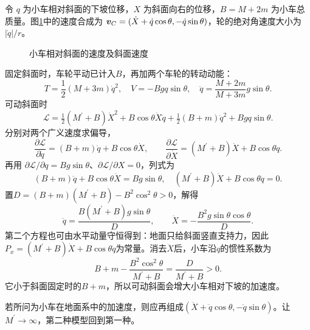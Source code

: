 \begin{solution}
令 $q$ 为小车相对斜面的下坡位移，$X$ 为斜面向右的位移，$B=M+2m$ 为小车总质量。图\ref{fig:hw1-5-s}中的速度合成为 $\bm{v}_C=(\dot X+\dot q\cos\theta,-\dot q\sin\theta)$，轮的绝对角速度大小为 $|\dot q|/r$。

\begin{figure}[H]\centering
{}
\caption{小车相对斜面的速度及斜面速度}\label{fig:hw1-5-s}
\end{figure}

固定斜面时，车轮平动已计入$B$，再加两个车轮的转动动能：
\[
 T=\frac12(M+3m)\dot q^2,\quad V=-Bgq\sin\theta,
 \quad\boxed{\ddot q=\frac{M+2m}{M+3m}g\sin\theta}.
\]
可动斜面时
\[
 \mathcal L=\tfrac12(M^\prime+B)\dot X^2+B\cos\theta\dot X\dot q
 +\tfrac12(B+m)\dot q^2+Bgq\sin\theta.
\]
分别对两个广义速度求偏导，
\[
\frac{\partial\mathcal L}{\partial\dot q}=(B+m)\dot q+B\cos\theta\dot X,
\qquad
\frac{\partial\mathcal L}{\partial\dot X}=(M^\prime+B)\dot X+B\cos\theta\dot q.
\]
再用 $\partial\mathcal L/\partial q=Bg\sin\theta$、$\partial\mathcal L/\partial X=0$，列式为
\[
 (B+m)\ddot q+B\cos\theta\ddot X=Bg\sin\theta,
 \quad(M^\prime+B)\ddot X+B\cos\theta\ddot q=0.
\]
置$D=(B+m)(M^\prime+B)-B^2\cos^2\theta>0$，解得
\[
 \boxed{\ddot q=\frac{B(M^\prime+B)g\sin\theta}{D},\qquad
 \ddot X=-\frac{B^2g\sin\theta\cos\theta}{D}}.
\]
第二个方程也可由水平动量守恒得到：地面只给斜面竖直支持力，因此$P_x=(M^\prime+B)\dot X+B\cos\theta\dot q$为常量。消去$\ddot X$后，小车沿$q$的惯性系数为
\[
 B+m-\frac{B^2\cos^2\theta}{M^\prime+B}=\frac{D}{M^\prime+B}>0.
\]
它小于斜面固定时的$B+m$，所以可动斜面会增大小车相对下坡的加速度。

若所问为小车在地面系中的加速度，则应再组成$(\ddot X+\ddot q\cos\theta,-\ddot q\sin\theta)$。让$M^\prime\to\infty$，第二种模型回到第一种。


\end{solution}




